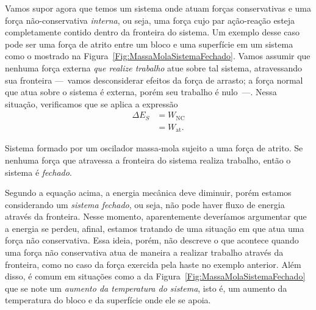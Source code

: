 Vamos supor agora que temos um sistema onde atuam forças conservativas e uma força não-conservativa \emph{interna}, ou seja, uma força cujo par ação-reação esteja completamente contido dentro da fronteira do sistema. Um exemplo desse caso pode ser uma força de atrito entre um bloco e uma superfície em um sistema como o mostrado na Figura~\ref{Fig:MassaMolaSistemaFechado}. Vamos assumir que nenhuma força externa \emph{que realize trabalho} atue sobre tal sistema, atravessando sua fronteira ---~vamos desconsiderar efeitos da força de arrasto; a força normal que atua sobre o sistema é externa, porém seu trabalho é nulo~---. Nessa situação, verificamos que se aplica a expressão
\begin{align}
    \Delta E_S &= W_{\textrm{NC}} \\
    &= W_{\textrm{at}}.
\end{align}

\begin{marginfigure}
\centering
{}
\caption{Sistema formado por um oscilador massa-mola sujeito a uma força de atrito. Se nenhuma força que atravessa a fronteira do sistema realiza trabalho, então o sistema é \emph{fechado}.\label{Fig:MassaMolaSistemaFechado}}
\end{marginfigure}

Segundo a equação acima, a energia mecânica deve diminuir, porém estamos considerando um \emph{sistema fechado}, ou seja, não pode haver fluxo de energia através da fronteira. Nesse momento, aparentemente deveríamos argumentar que a energia se perdeu, afinal, estamos tratando de uma situação em que atua uma força não conservativa. Essa ideia, porém, não descreve o que acontece quando uma força não conservativa atua de maneira a realizar trabalho através da fronteira, como no caso da força exercida pela haste no exemplo anterior. Além disso, é comum em situações como a da Figura~\ref{Fig:MassaMolaSistemaFechado} que se note um \emph{aumento da temperatura do sistema}, isto é, um aumento da temperatura do bloco e da superfície onde ele se apoia.

